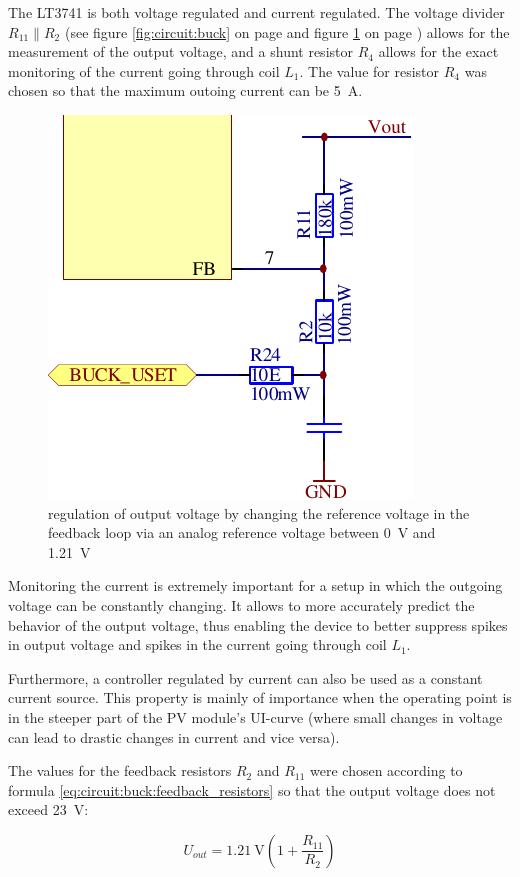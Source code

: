 The  LT3741  is both  voltage  regulated  and current  regulated. The  voltage
divider  $R_{11} \parallel  R_2$  (see figure  \ref{fig:circuit:buck} on  page
\pageref{fig:circuit:buck}  and  figure  \ref{fig:circuit:buck:uset}  on  page
\pageref{fig:circuit:buck:uset})  allows for  the  measurement  of the  output
voltage, and  a shunt resistor  $R_4$ allows for  the exact monitoring  of the
current going through  coil $L_1$. The value for resistor $R_4$  was chosen so
that the maximum outoing current can be \SI{5}{\ampere}.

\begin{figure}[th!]
    \center
    \includegraphics[width=.35\textwidth]{images/circuit/buck-uset.pdf}
    \caption{regulation of output voltage by changing the reference voltage in the feedback loop via an analog reference voltage between \SI{0}{\volt} and \SI{1.21}{\volt}}
    \label{fig:circuit:buck:uset}
\end{figure}

Monitoring  the current  is  extremely  important for  a  setup  in which  the
outgoing  voltage can  be constantly  changing. It allows  to more  accurately
predict the behavior of the output voltage, thus enabling the device to better
suppress spikes in output voltage and spikes in the current going through coil
$L_1$. %

Furthermore, a controller regulated by current  can also be used as a constant
current source. This property is mainly of importance when the operating point
is in  the steeper part  of the PV module's  UI-curve (where small  changes in
voltage can lead to drastic changes in current and vice versa).

The values for the feedback resistors $R_2$ and $R_{11}$ were chosen according
to formula \ref{eq:circuit:buck:feedback_resistors} so that the output voltage
does not exceed \SI{23}{\volt}:

\begin{equation}
    U_{out} = \SI{1.21}{\volt} \left( 1 + \frac{R_{11}}{R_2} \right)
    \label{eq:circuit:buck:feedback_resistors}
\end{equation}

